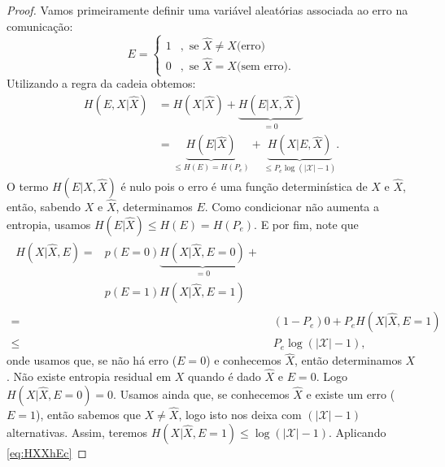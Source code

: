 \begin{proof}
  Vamos primeiramente definir uma variável aleatórias associada ao erro na comunicação:
  \begin{equation}
    E = \begin{cases} 1 &, \text{ se } \hat{X} \neq X \text{(erro)} \\
                0       &, \text{ se } \hat{X} = X \text{(sem erro)} .
        \end{cases}
  \end{equation}
  Utilizando a regra da cadeia obtemos:
  \begin{subequations}\label{eq:demfanoA}
    \begin{align}
      H(E,X|\hat{X}) &= H(X|\hat{X}) + \underbrace{H(E|X,\hat{X})}_{=0} \\
                     &= \underbrace{H(E|\hat{X})}_{\leq H(E) = H(P_e)} + \underbrace{H(X|E,\hat{X})}_{\leq P_e \log (\vert \mathcal{X} \vert - 1)} .
    \end{align}
  \end{subequations}
  O termo $H(E|X,\hat{X})$ é nulo pois o erro é uma função determinística de $X$ e $\hat{X}$, então, sabendo $X$ e $\hat{X}$, determinamos $E$.
  Como condicionar não aumenta a entropia, usamos $H(E|\hat{X}) \leq H(E) = H(P_e)$.
  E por fim, note que
  \begin{subequations}
    \begin{align}
      \begin{split}
        H(X|\hat{X},E) ={}& p(E=0) \underbrace{H(X|\hat{X},E=0)}_{=0} + \\
                          & p(E=1)H(X|\hat{X},E=1) 
      \end{split}\\
                     ={}& (1-P_e) 0 + P_e H(X|\hat{X},E=1) \\
                     \leq{}& P_e \log (\vert \mathcal{X} \vert - 1) , \label{eq:HXXhEc}
    \end{align}
  \end{subequations}
  onde usamos que, se não há erro ($E=0$) e conhecemos $\hat{X}$, então determinamos $X$. Não existe entropia residual em $X$ quando é dado $\hat{X}$ e $E=0$.
  Logo $H(X|\hat{X},E=0)=0$. Usamos ainda que, se conhecemos $\hat{X}$ e existe um erro ($E=1$), então sabemos que $X \neq \hat{X}$,
  logo isto nos deixa com $(\vert \mathcal{X} \vert - 1)$ alternativas.
  Assim, teremos $H(X|\hat{X},E=1) \leq \log (\vert \mathcal{X} \vert - 1)$.
  Aplicando \cref{eq:HXXhEc} %

\end{proof}
